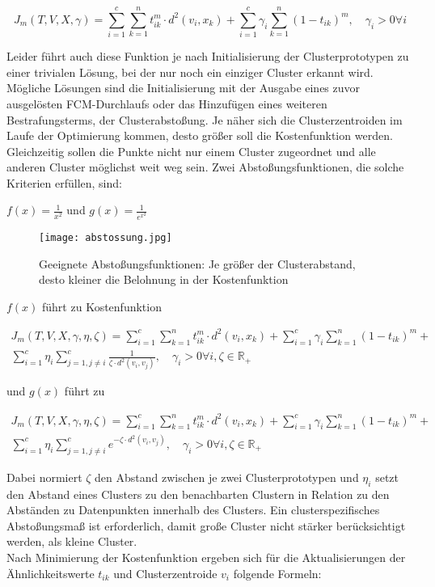 \documentclass[11pt,ceqn]{book}
\begin{document}
$$J_m(T,V,X,\gamma) = \sum_{i=1}^{c} \sum_{k=1}^{n} t_{ik}^m \cdot d^2(v_i,x_k) + \sum_{i=1}^c  \gamma_i \sum_{k=1}^n (1-t_{ik})^m,\quad \gamma_i>0 \forall i$$

Leider führt auch diese Funktion je nach Initialisierung der Clusterprototypen zu einer trivialen Lösung, bei der nur noch ein einziger Cluster erkannt wird. Mögliche Lösungen sind die Initialisierung mit der Ausgabe eines zuvor ausgelösten FCM-Durchlaufs oder das Hinzufügen eines weiteren Bestrafungsterms, der Clusterabstoßung. Je näher sich die Clusterzentroiden im Laufe der Optimierung kommen, desto größer soll die Kostenfunktion werden. Gleichzeitig sollen die Punkte nicht nur einem Cluster zugeordnet und alle anderen Cluster möglichst weit weg sein. Zwei Abstoßungsfunktionen\cite{cabstossung}, die solche Kriterien erfüllen, sind:

$f(x) = \frac{1}{x^2}$ und $g(x) = \frac{1}{e^{x^2}}$

\begin{figure}[H]
\centering
\texttt{[image: abstossung.jpg]}
 \caption{Geeignete Abstoßungsfunktionen: Je größer der Clusterabstand, desto kleiner die Belohnung in der Kostenfunktion}
\end{figure}

$f(x)$ führt zu Kostenfunktion

\begin{equation}
\begin{split}
J_m(T,V,X,\gamma,\eta,\zeta) = \sum_{i=1}^{c} \sum_{k=1}^{n} t_{ik}^m \cdot d^2(v_i,x_k) + \sum_{i=1}^c  \gamma_i \sum_{k=1}^n (1-t_{ik})^m + \\ \sum_{i=1}^c \eta_i \sum_{j=1,j\neq i}^c \frac{1}{\zeta\cdot d^2(v_i,v_j)},\quad \gamma_i>0 \forall i, \zeta\in \mathbb{R_+}
\end{split}
\end{equation}

und $g(x)$ führt zu 

\begin{equation}
\begin{split}
J_m(T,V,X,\gamma,\eta,\zeta) = \sum_{i=1}^{c} \sum_{k=1}^{n} t_{ik}^m \cdot d^2(v_i,x_k) + \sum_{i=1}^c  \gamma_i \sum_{k=1}^n (1-t_{ik})^m + \\ \sum_{i=1}^c \eta_i \sum_{j=1,j\neq i}^c e^{-\zeta\cdot d^2(v_i,v_j)},\quad \gamma_i>0 \forall i, \zeta\in \mathbb{R_+}
\end{split}
\end{equation}

Dabei normiert $\zeta$ den Abstand zwischen je zwei Clusterprototypen und $\eta_i$ setzt den Abstand eines Clusters zu den benachbarten Clustern in Relation zu den Abständen zu Datenpunkten innerhalb des Clusters. Ein clusterspezifisches Abstoßungsmaß ist erforderlich, damit große Cluster nicht stärker berücksichtigt werden, als kleine Cluster.
\\
Nach Minimierung der Kostenfunktion ergeben sich für die Aktualisierungen der Ähnlichkeitswerte $t_{ik}$ und Clusterzentroide $v_i$ folgende Formeln:
\end{document}
